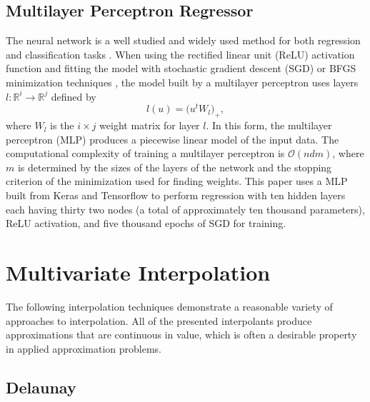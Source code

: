 \documentclass[smallextended,final]{svjour3}       %
\begin{document}
\subsection{Multilayer Perceptron Regressor}
\label{sec:mlp}
The neural network is a well studied and widely used method for both
regression and classification tasks
\cite{rumelhart1988learning,hornik1989multilayer}. When using the rectified
linear unit (ReLU) activation function \cite{dahl2013improving} and fitting
the model with stochastic gradient descent (SGD) or BFGS minimization
techniques \cite{goh2017why,moller1993scaled,robbins1951stochastic}, the
model built by a multilayer perceptron uses layers $l : \mathbb{R}^{i}
\rightarrow \mathbb{R}^{j}$ defined by
 $$ l(u) = \bigl( u^t W_l \bigr)_+ ,$$
where $W_l$ is the $i\times j$ weight matrix for layer $l$. In this form,
the multilayer perceptron (MLP) produces a piecewise linear model of the
input data. The computational complexity of training a multilayer perceptron
is $\mathcal{O}(n d m)$, where $m$ is determined by the sizes of the layers
of the network and the stopping criterion of the minimization used for
finding weights. This paper uses a MLP built from Keras and Tensorflow to
perform regression \cite{chollet2015keras,tensorflow2015-whitepaper} with
ten hidden layers each having thirty two nodes (a total of approximately
ten thousand parameters), ReLU activation, and five thousand epochs of SGD
for training.

\section{Multivariate Interpolation}
\label{sec:interpolation}
The following interpolation techniques demonstrate a reasonable variety of approaches to interpolation. All of the presented interpolants produce approximations that are continuous in value, which is often a desirable property in applied approximation problems.

\subsection{Delaunay}
\label{sec:delaunay}
\end{document}
